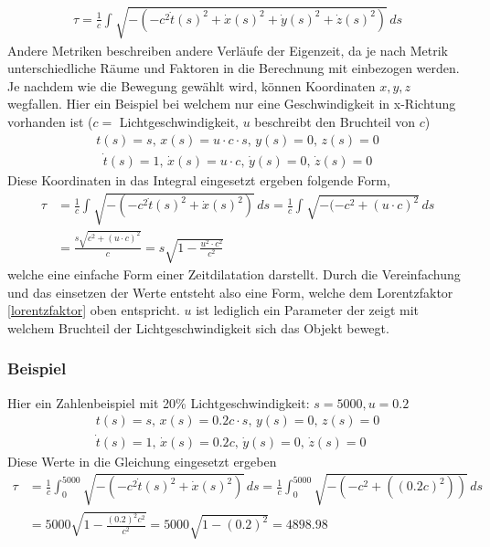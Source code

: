 \begin{refsection}
\begin{align*}
    \tau
    =
    \frac{1}{c}\int_{}^{}\sqrt{-(-c^2\dot{t}(s)^{2}+\dot{x}(s)^{2}+\dot{y}(s)^{2}+\dot{z}(s)^{2})}\,ds
\end{align*}
Andere Metriken beschreiben andere Verläufe der Eigenzeit, da je nach Metrik unterschiedliche Räume und Faktoren in die Berechnung mit einbezogen werden. 
Je nachdem wie die Bewegung gew\"ahlt wird, können Koordinaten $x, y, z$ wegfallen.
Hier ein Beispiel bei welchem nur eine Geschwindigkeit in x-Richtung vorhanden ist ($c =$ Lichtgeschwindigkeit, $u$ beschreibt den Bruchteil von $c$)
\begin{align*}
     t(s)= s,\,
 	 x(s)=u\cdot c \cdot s,\,
     y(s)=0,\,
     z(s)=0 
\end{align*}
\begin{align*}
     \dot{t}(s)=1,\,
     \dot{x}(s)=u\cdot c,\,
     \dot{y}(s)=0,\,
     \dot{z}(s)=0
\end{align*}
Diese Koordinaten in das Integral eingesetzt ergeben folgende Form,
\begin{align*}
\tau
&=
\frac{1}{c}\int_{}^{}\sqrt{-(-c^2\dot{t}(s)^2+\dot{x}(s)^2)}\,ds 
=
\frac{1}{c}\int_{}^{}\sqrt{-(-c^2 +(u\cdot c)^{2}}\,ds\\
&=
\frac{s\sqrt{c^2+(u\cdot c)^{2}}}{c} 
=
s\sqrt{1-\frac{u^2\cdot c^2}{c^2}}
\end{align*}
welche eine einfache Form einer Zeitdilatation darstellt. Durch die Vereinfachung und das einsetzen der Werte entsteht also eine Form, welche dem Lorentzfaktor \eqref{lorentzfaktor} oben entspricht.
$u$ ist lediglich ein Parameter der zeigt mit welchem Bruchteil der Lichtgeschwindigkeit sich das Objekt bewegt.

\subsubsection{Beispiel}

Hier ein Zahlenbeispiel mit 20\% Lichtgeschwindigkeit:
$s=5000, u=0.2$ 
\begin{align*}
    t(s)=s,\,
    x(s)=0.2c \cdot s,\,
    y(s)=0,\,
    z(s)=0 
    \\
    \dot{t}(s)=1,\,
    \dot{x}(s)=0.2c,\,
    \dot{y}(s)=0,\,
    \dot{z}(s)=0
\end{align*}
Diese Werte in die Gleichung eingesetzt ergeben
\begin{align*}
 \tau
&=
\frac{1}{c}\int_{0}^{5000}\sqrt{-(-c^2\dot{t}(s)^2+\dot{x}(s)^2)}\,ds
=
\frac{1}{c}\int_{0}^{5000}\sqrt{-(-c^2+((0.2c)^2))}\,ds\\
&=
5000\sqrt{1-\frac{(0.2)^2 c^2}{c^2}} 
=
5000\sqrt{1-(0.2)^2}
=
4898.98
\end{align*}


\end{refsection}
